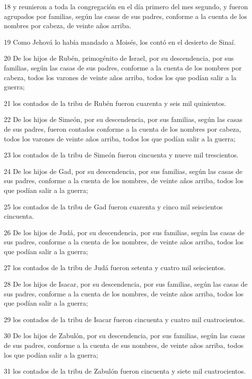 \par 18 y reunieron a toda la congregación en el día primero del mes segundo, y fueron agrupados por familias, según las casas de sus padres, conforme a la cuenta de los nombres por cabeza, de veinte años arriba.
\par 19 Como Jehová lo había mandado a Moisés, los contó en el desierto de Sinaí.
\par 20 De los hijos de Rubén, primogénito de Israel, por su descendencia, por sus familias, según las casas de sus padres, conforme a la cuenta de los nombres por cabeza, todos los varones de veinte años arriba, todos los que podían salir a la guerra;
\par 21 los contados de la tribu de Rubén fueron cuarenta y seis mil quinientos.
\par 22 De los hijos de Simeón, por su descendencia, por sus familias, según las casas de sus padres, fueron contados conforme a la cuenta de los nombres por cabeza, todos los varones de veinte años arriba, todos los que podían salir a la guerra;
\par 23 los contados de la tribu de Simeón fueron cincuenta y nueve mil trescientos.
\par 24 De los hijos de Gad, por su descendencia, por sus familias, según las casas de sus padres, conforme a la cuenta de los nombres, de veinte años arriba, todos los que podían salir a la guerra;
\par 25 los contados de la tribu de Gad fueron cuarenta y cinco mil seiscientos cincuenta.
\par 26 De los hijos de Judá, por su descendencia, por sus familias, según las casas de sus padres, conforme a la cuenta de los nombres, de veinte años arriba, todos los que podían salir a la guerra;
\par 27 los contados de la tribu de Judá fueron setenta y cuatro mil seiscientos.
\par 28 De los hijos de Isacar, por su descendencia, por sus familias, según las casas de sus padres, conforme a la cuenta de los nombres, de veinte años arriba, todos los que podían salir a la guerra;
\par 29 los contados de la tribu de Isacar fueron cincuenta y cuatro mil cuatrocientos.
\par 30 De los hijos de Zabulón, por su descendencia, por sus familias, según las casas de sus padres, conforme a la cuenta de sus nombres, de veinte años arriba, todos los que podían salir a la guerra;
\par 31 los contados de la tribu de Zabulón fueron cincuenta y siete mil cuatrocientos.
